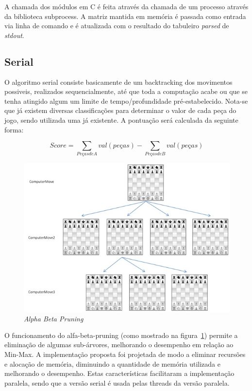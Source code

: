 \documentclass[12pt,a4paper,final]{article}
\begin{document}
A chamada dos módulos em C é feita através da chamada de um processo através da biblioteca subprocess. A matriz mantida em memória é passada como entrada via linha de comando e é atualizada com o resultado do tabuleiro \textit{parsed} de \textit{stdout}.

\subsection{Serial}

O algoritmo serial consiste basicamente de um backtracking dos movimentos possiveis, realizados sequencialmente, até que toda a computação acabe ou que se tenha atingido algum um limite de tempo/profundidade pré-estabelecido. Nota-se que já existem diversas classificações para determinar o valor de cada peça do jogo, sendo utilizada uma já existente. A pontuação será calculada da seguinte forma:

\begin{equation}
Score = \sum_{Peças de A} val(peças) - \sum_{Peças de B} val(peças)
\end{equation}

\begin{figure}[H]
\centering
\label{fig1}
\caption{\textit{Alpha Beta Pruning}}
\includegraphics[scale=1]{../presentation/huoChess_2.jpg}
\end{figure}

O funcionamento do alfa-beta-pruning (como mostrado na figura~\ref{fig1})  permite a eliminação de algumas sub-árvores, melhorando o desempenho em relação ao Min-Max. A implementação proposta foi projetada de modo a eliminar recursões e alocação de memória, diminuindo a quantidade de memória utilizada e melhorando o desempenho. Estas características facilitaram a implementação paralela, sendo que a versão serial é usada pelas threads da versão paralela.
\end{document}
